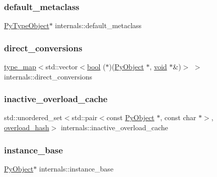 \subsubsection{\texorpdfstring{default\_metaclass}{default\_metaclass}}
{\footnotesize\ttfamily \mbox{\hyperlink{_python27_2object_8h_a42a55dd6e973872c7a6bc61632070f6f}{Py\+Type\+Object}}$\ast$ internals\+::default\+\_\+metaclass}

\mbox{\label{structinternals_acec753819721884fcd4a650dcdfa40d2}} 
\subsubsection{\texorpdfstring{direct\_conversions}{direct\_conversions}}
{\footnotesize\ttfamily \mbox{\hyperlink{internals_8h_a1452521ed22e2af29a7f00dfd4bacb0b}{type\+\_\+map}}$<$std\+::vector$<$\mbox{\hyperlink{asdl_8h_af6a258d8f3ee5206d682d799316314b1}{bool}} ($\ast$)(\mbox{\hyperlink{_python27_2object_8h_aadc84ac7aed2cfa6f20c25f62bf3dac7}{Py\+Object}} $\ast$, \mbox{\hyperlink{_s_d_l__opengles2__gl2ext_8h_ae5d8fa23ad07c48bb609509eae494c95}{void}} $\ast$\&)$>$ $>$ internals\+::direct\+\_\+conversions}

\mbox{\label{structinternals_a46a3096ec216e6229e944bbc6cff7b3d}} 
\subsubsection{\texorpdfstring{inactive\_overload\_cache}{inactive\_overload\_cache}}
{\footnotesize\ttfamily std\+::unordered\+\_\+set$<$std\+::pair$<$const \mbox{\hyperlink{_python27_2object_8h_aadc84ac7aed2cfa6f20c25f62bf3dac7}{Py\+Object}} $\ast$, const char $\ast$$>$, \mbox{\hyperlink{structoverload__hash}{overload\+\_\+hash}}$>$ internals\+::inactive\+\_\+overload\+\_\+cache}

\mbox{\label{structinternals_ad18c3a70ddfa0ec128e4f8013f81c6bd}} 
\subsubsection{\texorpdfstring{instance\_base}{instance\_base}}
{\footnotesize\ttfamily \mbox{\hyperlink{_python27_2object_8h_aadc84ac7aed2cfa6f20c25f62bf3dac7}{Py\+Object}}$\ast$ internals\+::instance\+\_\+base}

